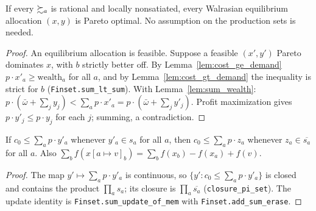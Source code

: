 \begin{theorem}
\label{thm:first_welfare_production}
\leanok
{}
If every $\succsim_a$ is rational and locally nonsatiated, every Walrasian equilibrium allocation $(x, y)$ is Pareto
optimal. No assumption on the production sets is needed.
\end{theorem}
\begin{proof}
\leanok
{}
An equilibrium allocation is feasible. Suppose a feasible $(x', y')$ Pareto dominates $x$, with $b$ strictly better
off. By Lemma~\ref{lem:cost_ge_demand} $p \cdot x'_a \ge \mathrm{wealth}_a$ for all $a$, and by
Lemma~\ref{lem:cost_gt_demand} the inequality is strict for $b$ (\texttt{Finset.sum\_lt\_sum}). With
Lemma~\ref{lem:sum_wealth}: $p \cdot (\bar\omega + \sum_j y_j) < \sum_a p \cdot x'_a = p\cdot(\bar\omega + \sum_j y'_j)$.
Profit maximization gives $p \cdot y'_j \le p \cdot y_j$ for each $j$; summing, a contradiction.
\end{proof}

\begin{lemma}
\label{lem:le_sum_cost_closure}
\leanok
If $c_0 \le \sum_a p \cdot y'_a$ whenever $y'_a \in s_a$ for all $a$, then $c_0 \le \sum_a p \cdot z_a$ whenever
$z_a \in \overline{s_a}$ for all $a$. Also $\sum_b f(x[a \mapsto v]_b) = \sum_b f(x_b) - f(x_a) + f(v)$.
\end{lemma}
\begin{proof}
\leanok
The map $y' \mapsto \sum_a p \cdot y'_a$ is continuous, so $\{y' : c_0 \le \sum_a p\cdot y'_a\}$ is closed and contains
the product $\prod_a s_a$; its closure is $\prod_a \overline{s_a}$ (\texttt{closure\_pi\_set}). The update identity is
\texttt{Finset.sum\_update\_of\_mem} with \texttt{Finset.add\_sum\_erase}.
\end{proof}

